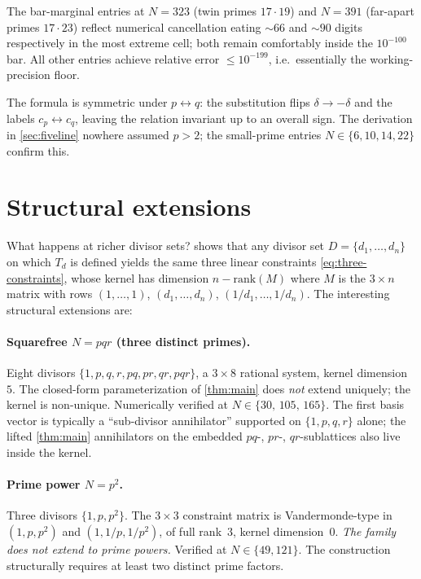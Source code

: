 \documentclass[11pt,reqno]{amsart}
\theoremstyle{definition}
\begin{document}
The bar-marginal entries at $N = 323$ (twin primes $17 \cdot 19$) and
$N = 391$ (far-apart primes $17 \cdot 23$) reflect numerical
cancellation eating $\sim 66$ and $\sim 90$ digits respectively in
the most extreme cell; both remain comfortably inside the $10^{-100}$
bar. All other entries achieve relative error $\le 10^{-199}$, i.e.\
essentially the working-precision floor.

The formula is symmetric under $p \leftrightarrow q$: the substitution
flips $\delta \to -\delta$ and the labels $c_p \leftrightarrow c_q$,
leaving the relation invariant up to an overall sign. The derivation
in \cref{sec:fiveline} nowhere assumed $p > 2$; the small-prime
entries $N \in \{6, 10, 14, 22\}$ confirm this.

\section{Structural extensions}\label{sec:extensions}

What happens at richer divisor sets?  shows that
any divisor set $D = \{d_1, \ldots, d_n\}$ on which $T_d$ is defined
yields the same three linear constraints \eqref{eq:three-constraints},
whose kernel has dimension $n - \mathrm{rank}(M)$ where $M$ is the
$3 \times n$ matrix with rows $(1, \ldots, 1)$,
$(d_1, \ldots, d_n)$, $(1/d_1, \ldots, 1/d_n)$. The interesting
structural extensions are:

\paragraph{Squarefree $N = pqr$ (three distinct primes).}
Eight divisors $\{1, p, q, r, pq, pr, qr, pqr\}$, a $3 \times 8$
rational system, kernel dimension~$5$. The closed-form
parameterization of \cref{thm:main} does \emph{not} extend uniquely;
the kernel is non-unique. Numerically verified at
$N \in \{30,\, 105,\, 165\}$. The first basis vector is typically a
``sub-divisor annihilator'' supported on $\{1, p, q, r\}$ alone; the
lifted \cref{thm:main} annihilators on the embedded $pq$-, $pr$-,
$qr$-sublattices also live inside the kernel.

\paragraph{Prime power $N = p^2$.}
Three divisors $\{1, p, p^2\}$. The $3 \times 3$ constraint matrix is
Vandermonde-type in $(1, p, p^2)$ and $(1, 1/p, 1/p^2)$, of full
rank~$3$, kernel dimension~$0$. \emph{The family does not extend to
prime powers.} Verified at $N \in \{49, 121\}$. The construction
structurally requires at least two distinct prime factors.
\end{document}
